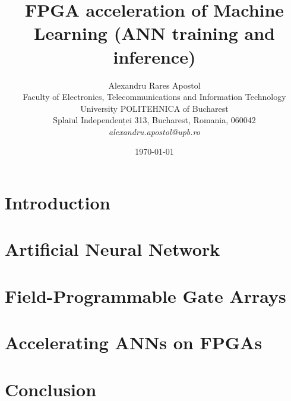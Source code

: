 \documentclass[12pt]{article}
\title{FPGA acceleration of Machine Learning (ANN training and inference)}
\author{Alexandru Rares Apostol\\
Faculty of Electronics, Telecommunications and Information Technology\\
University POLITEHNICA of Bucharest\\
Splaiul Independenței 313, Bucharest, Romania, 060042 \\
\emph{alexandru.apostol@upb.ro}}
\date{\today}
\begin{document}
\maketitle

\begin{abstract}

\end{abstract}

\section{Introduction}
\label{sec:introduction}


\section{Artificial Neural Network}
\label{sec:artificialNeuron}


\section{Field-Programmable Gate Arrays}
\label{sec:fpgaVerilog}


\section{Accelerating ANNs on FPGAs}
\label{sec:accelAnnFpga}


\section{Conclusion}
\label{sec:conclusion}




\end{document}
